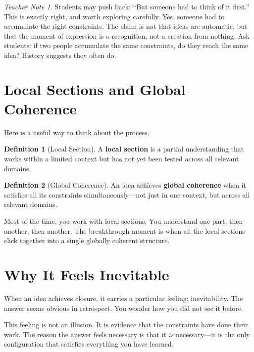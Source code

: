 \documentclass[11pt]{book}
\theoremstyle{definition}
\newtheorem{definition}{Definition}[chapter]
\theoremstyle{remark}
\newtheorem{teachernote}{Teacher Note}[chapter]
\begin{document}
\begin{teachernote}
Students may push back: ``But someone had to think of it first.'' This
is exactly right, and worth exploring carefully. Yes, someone had to
accumulate the right constraints. The claim is not that ideas are
automatic, but that the moment of expression is a recognition, not a
creation from nothing. Ask students: if two people accumulate the same
constraints, do they reach the same idea? History suggests they often do.
\end{teachernote}

\section{Local Sections and Global Coherence}

Here is a useful way to think about the process.

\begin{definition}[Local Section]
A \textbf{local section} is a partial understanding that works within a
limited context but has not yet been tested across all relevant domains.
\end{definition}

\begin{definition}[Global Coherence]
An idea achieves \textbf{global coherence} when it satisfies all its
constraints simultaneously---not just in one context, but across all
relevant domains.
\end{definition}

Most of the time, you work with local sections. You understand one part,
then another, then another. The breakthrough moment is when all the local
sections click together into a single globally coherent structure.

\section{Why It Feels Inevitable}

When an idea achieves closure, it carries a particular feeling: inevitability.
The answer seems obvious in retrospect. You wonder how you did not see it
before.

This feeling is not an illusion. It is evidence that the constraints have
done their work. The reason the answer feels necessary is that it \emph{is}
necessary---it is the only configuration that satisfies everything you have
learned.
\end{document}
